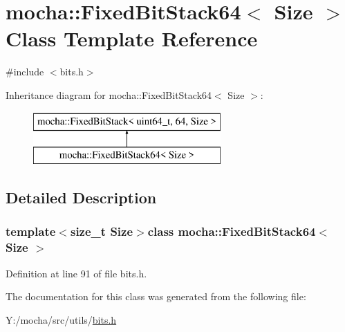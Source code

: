 \hypertarget{classmocha_1_1_fixed_bit_stack64}{
\section{mocha::FixedBitStack64$<$ Size $>$ Class Template Reference}
\label{classmocha_1_1_fixed_bit_stack64}
}


{\ttfamily \#include $<$bits.h$>$}

Inheritance diagram for mocha::FixedBitStack64$<$ Size $>$:\begin{figure}[H]
\begin{center}
\leavevmode
\includegraphics[height=2.000000cm]{classmocha_1_1_fixed_bit_stack64}
\end{center}
\end{figure}


\subsection{Detailed Description}
\subsubsection*{template$<$size\_\-t Size$>$class mocha::FixedBitStack64$<$ Size $>$}



Definition at line 91 of file bits.h.



The documentation for this class was generated from the following file:\begin{DoxyCompactItemize}
\item 
Y:/mocha/src/utils/\hyperlink{bits_8h}{bits.h}\end{DoxyCompactItemize}
